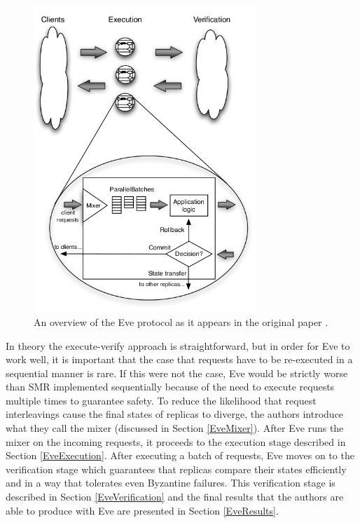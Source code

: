 \documentclass[11pt, oneside]{report}
\begin{document}
\begin{figure}[h]
\centering
\includegraphics[width=0.75\textwidth]{eveOverview.png}
\caption{\label{eveDiagram} An overview of the Eve protocol as it appears in the original paper \protect\cite{eve}.}
\end{figure}

In theory the execute-verify approach is straightforward, but in order for Eve to work well, it is important that the case that requests have to be re-executed in a sequential manner is rare. 
If this were not the case, Eve would be strictly worse than SMR implemented sequentially because of the need to execute requests multiple times to guarantee safety. 
To reduce the likelihood that request interleavings cause the final states of replicas to diverge, the authors introduce what they call the mixer (discussed in Section \ref{EveMixer}). 
After Eve runs the mixer on the incoming requests, it proceeds to the execution stage described in Section \ref{EveExecution}. 
After executing a batch of requests, Eve moves on to the verification stage which guarantees that replicas compare their states efficiently and in a way that tolerates even Byzantine failures. 
This verification stage is described in Section \ref{EveVerification} and the final results that the authors are able to produce with Eve are presented in Section \ref{EveResults}.
\end{document}
